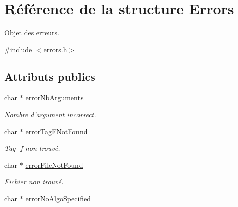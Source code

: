 \hypertarget{structErrors}{
\section{Référence de la structure Errors}
\label{structErrors}
}


Objet des erreurs.  




{\ttfamily \#include $<$errors.h$>$}

\subsection*{Attributs publics}
\begin{DoxyCompactItemize}
\item 
\hypertarget{structErrors_add18d77e05e1b61b88feeb2d5bdf5525}{
char $\ast$ \hyperlink{structErrors_add18d77e05e1b61b88feeb2d5bdf5525}{errorNbArguments}}
\label{structErrors_add18d77e05e1b61b88feeb2d5bdf5525}

\begin{DoxyCompactList}\small\item\em Nombre d'argument incorrect. \item\end{DoxyCompactList}\item 
\hypertarget{structErrors_ae16317e85c4bbd2d2f8aa0412e87790f}{
char $\ast$ \hyperlink{structErrors_ae16317e85c4bbd2d2f8aa0412e87790f}{errorTagFNotFound}}
\label{structErrors_ae16317e85c4bbd2d2f8aa0412e87790f}

\begin{DoxyCompactList}\small\item\em Tag -\/f non trouvé. \item\end{DoxyCompactList}\item 
\hypertarget{structErrors_a7133eba5ff36c1f6d71a6cd2bcc0e8b1}{
char $\ast$ \hyperlink{structErrors_a7133eba5ff36c1f6d71a6cd2bcc0e8b1}{errorFileNotFound}}
\label{structErrors_a7133eba5ff36c1f6d71a6cd2bcc0e8b1}

\begin{DoxyCompactList}\small\item\em Fichier non trouvé. \item\end{DoxyCompactList}\item 
\hypertarget{structErrors_a23cf6180d45a3075891ab189d0eb9023}{
char $\ast$ \hyperlink{structErrors_a23cf6180d45a3075891ab189d0eb9023}{errorNoAlgoSpecified}}
\label{structErrors_a23cf6180d45a3075891ab189d0eb9023}


\end{DoxyCompactItemize}
